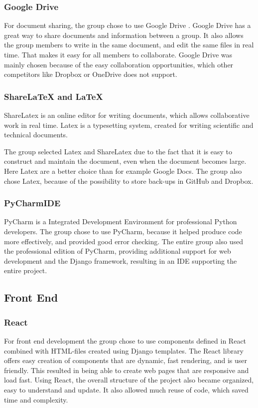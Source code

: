 \subsubsection{Google Drive}
For document sharing, the group chose to use Google Drive \cite{GoogleDrive}. Google Drive has a great way to share documents and information between a group. It also allows the group members to write in the same document, and edit the same files in real time. That makes it easy for all members to collaborate. Google Drive was mainly chosen because of the easy collaboration opportunities, which other competitors like Dropbox or OneDrive does not support. 

\subsubsection{ShareLaTeX and LaTeX}
ShareLatex \cite{ShareLatex} is an online editor for writing documents, which allows collaborative work in real time. Latex is a typesetting system, created for writing scientific and technical documents.

The group selected Latex and ShareLatex due to the fact that it is easy to construct and maintain the document, even when the document becomes large. Here Latex are a better choice than for example Google Docs. The group also chose Latex, because of the possibility to store back-ups in GitHub and Dropbox.

\subsubsection{PyCharmIDE}
PyCharm\cite{PyCharm} is a Integrated Development Environment for professional Python developers. The group chose to use PyCharm, because it helped produce code more effectively, and provided good error checking. The entire group also used the professional edition of PyCharm, providing additional support for web development and the Django framework, resulting in an IDE supporting the entire project.

\subsection{Front End}
\subsubsection{React}
For front end development the group chose to use components defined in React \cite{React} combined with HTML-files created using Django templates. The React library offers easy creation of components that are dynamic, fast rendering, and is user friendly. This resulted in being able to create web pages that are responsive and load fast. Using React, the overall structure of the project also became organized, easy to understand and update. It also allowed much reuse of code, which saved time and complexity. 

